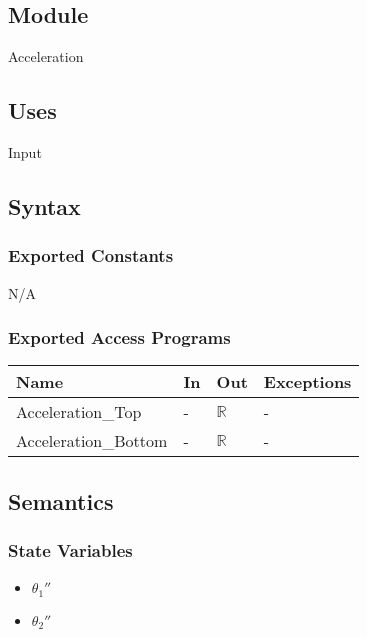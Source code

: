 \documentclass[12pt, titlepage]{article}
\begin{document}
\subsection{Module}
Acceleration

\subsection{Uses}
Input

\subsection{Syntax}

\subsubsection{Exported Constants}
N/A

\subsubsection{Exported Access Programs}

\begin{center}
\begin{tabular}{p{4cm} p{2cm} p{2cm} p{4cm}}
\hline
\textbf{Name} & \textbf{In} & \textbf{Out} & \textbf{Exceptions} \\
\hline
Acceleration\_Top & - & $\mathbb{R}$ & - \\
\hline
Acceleration\_Bottom & - & $\mathbb{R}$ & - \\
\hline
\end{tabular}
\end{center}


\subsection{Semantics}

\subsubsection{State Variables}
\begin{itemize}
\item ${\theta_1}''$
\item ${\theta_2}''$
\end{itemize}
\end{document}

